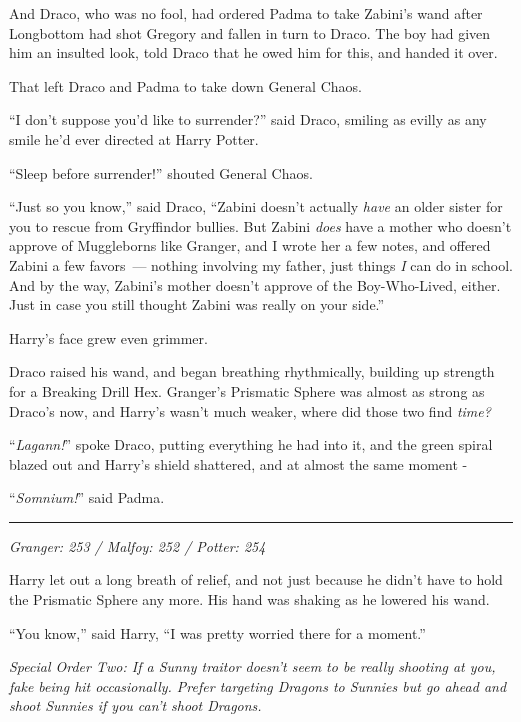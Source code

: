 And Draco, who was no fool, had ordered Padma to take Zabini's wand after Longbottom had shot Gregory and fallen in turn to Draco. The boy had given him an insulted look, told Draco that he owed him for this, and handed it over.

That left Draco and Padma to take down General Chaos.

``I don't suppose you'd like to surrender?'' said Draco, smiling as evilly as any smile he'd ever directed at Harry Potter.

``Sleep before surrender!'' shouted General Chaos.

``Just so you know,'' said Draco, ``Zabini doesn't actually \emph{have} an older sister for you to rescue from Gryffindor bullies. But Zabini \emph{does} have a mother who doesn't approve of Muggleborns like Granger, and I wrote her a few notes, and offered Zabini a few favors~--- nothing involving my father, just things \emph{I} can do in school. And by the way, Zabini's mother doesn't approve of the Boy-Who-Lived, either. Just in case you still thought Zabini was really on your side.''

Harry's face grew even grimmer.

Draco raised his wand, and began breathing rhythmically, building up strength for a Breaking Drill Hex. Granger's Prismatic Sphere was almost as strong as Draco's now, and Harry's wasn't much weaker, where did those two find \emph{time?}

``\emph{Lagann!}'' spoke Draco, putting everything he had into it, and the green spiral blazed out and Harry's shield shattered, and at almost the same moment -

``\emph{Somnium!}'' said Padma.

\begin{center}\rule{3in}{0.4pt}\end{center}

\emph{Granger: 253 / Malfoy: 252 / Potter: 254}

Harry let out a long breath of relief, and not just because he didn't have to hold the Prismatic Sphere any more. His hand was shaking as he lowered his wand.

``You know,'' said Harry, ``I was pretty worried there for a moment.''

\emph{Special Order Two: If a Sunny traitor doesn't seem to be really shooting at you, fake being hit occasionally. Prefer targeting Dragons to Sunnies but go ahead and shoot Sunnies if you can't shoot Dragons.}

